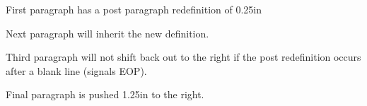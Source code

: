 

{\leftskip=0.0in

\par}

{\leftskip=0.25in

\par}


{\leftskip=0.5in

\par}

{\leftskip=1.0in

\par}

First paragraph has a post paragraph redefinition of 0.25in
\leftskip=0.25in

Next paragraph will inherit the new definition.

Third paragraph will not shift back out to the right if
the post redefinition occurs after a blank line (signals EOP).

\leftskip=1.25in

Final paragraph is pushed 1.25in to the right.

\bye
